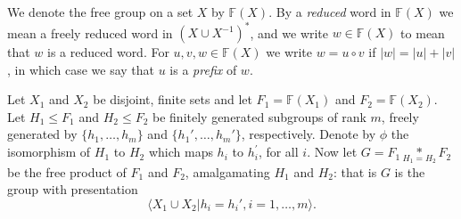 \documentclass[a4paper,12pt]{article}
\numberwithin{equation}{section}
\numberwithin{figure}{section}
\newcommand{\FF}{\ensuremath{\mathbb{F}}}
\newcommand{\la}{\langle}
\newcommand{\ra}{\rangle}
\begin{document}
We denote the free group on a set $X$ by $\FF(X)$.
 By a {\em reduced} word in $\FF(X)$  we mean
 a freely reduced word in $(X\cup X^{-1})^\ast$, and we write $w\in \FF(X)$
to mean that $w$ is a reduced word. For $u,v, w\in \FF(X)$ we
write $w=u\circ v$ if $|w|=|u|+|v|$, in which case we say that $u$ is a {\em prefix}
of $w$.

Let $X_1$ and $X_2$ be disjoint,
finite sets and let
$F_1=\FF(X_1)$ and $F_2=\FF(X_2)$.
Let $H_1 \leq F_1$ and  $H_2 \leq F_2$ be finitely generated subgroups of rank $m$,
freely generated by $\{h_1,\ldots, h_m\}$ and  $\{h_1', \ldots, h_m'\}$, respectively.
Denote by $\phi$ the isomorphism of $H_1$ to $H_2$ which maps $h_i$ to  $h_i^\prime$,
for all $i$.
 Now let $G = F_1 \underset{H_1=H_2}{\ast} F_2$ be the free product  of $F_1$ and
$F_2$, amalgamating $H_1$ and $H_2$: that is $G$ is the group
 with
 presentation \[\la X_1\cup X_2 | h_i = h_i', i=1, \ldots ,m\ra.\]
\end{document}
